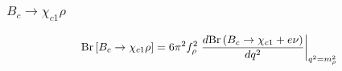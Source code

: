 \documentclass{beamer}
\begin{document}
\begin{frame}
  \frametitle{$B_c \to \chi_{c1} \rho$}
  $$
  \mathrm{Br}\left[B_c \to \chi_{c1} \rho\right] =
  6\pi^2 f_\rho^2 \left.
    \frac{d\mathrm{Br}\left(B_c\to\chi_{c1}+e\nu\right)}{dq^2}
  \right|_{q^2=m_\rho^2}
  $$
  \begin{columns}
    \begin{column}{0.5\textwidth}
      \vspace{3mm}
      
    \end{column}
  \begin{column}{0.5\textwidth}
      \\
      \vspace{3mm}
      
    \end{column}
\end{columns}
\end{frame}
\end{document}
